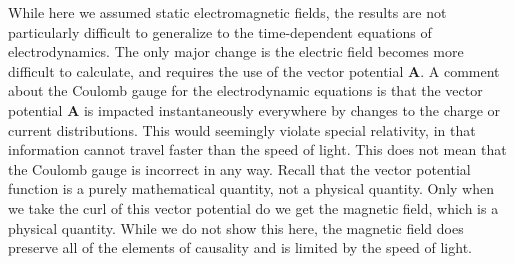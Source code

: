 While here we assumed static electromagnetic fields, the results are not particularly difficult to generalize to the time-dependent equations of electrodynamics. The only major change is the electric field becomes more difficult to calculate, and requires the use of the vector potential $\mathbf{A}$. A comment about the Coulomb gauge for the electrodynamic equations is that the vector potential $\mathbf{A}$ is impacted instantaneously everywhere by changes to the charge or current distributions. This would seemingly violate special relativity, in that information cannot travel faster than the speed of light. This does not mean that the Coulomb gauge is incorrect in any way. Recall that the vector potential function is a purely mathematical quantity, not a physical quantity. Only when we take the curl of this vector potential do we get the magnetic field, which is a physical quantity. While we do not show this here, the magnetic field does preserve all of the elements of causality and is limited by the speed of light.





